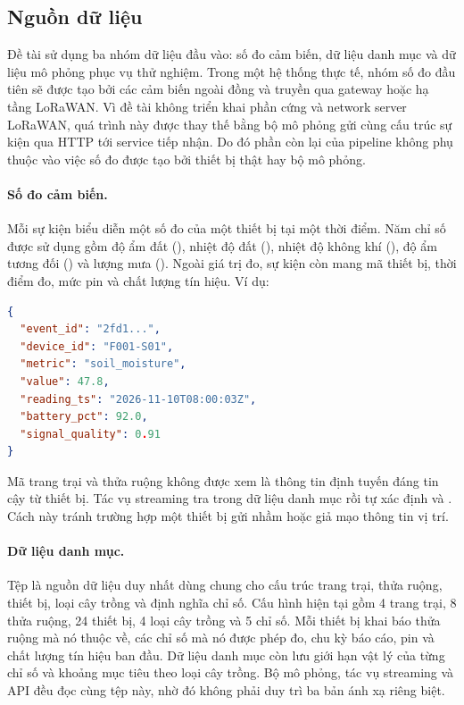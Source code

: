 \subsection{Nguồn dữ liệu}
\label{sec:3-data-sources-detail}

Đề tài sử dụng ba nhóm dữ liệu đầu vào: số đo cảm biến, dữ liệu danh mục và dữ liệu mô phỏng phục vụ thử nghiệm. Trong một hệ thống thực tế, nhóm số đo đầu tiên sẽ được tạo bởi các cảm biến ngoài đồng và truyền qua gateway hoặc hạ tầng LoRaWAN. Vì đề tài không triển khai phần cứng và network server LoRaWAN, quá trình này được thay thế bằng bộ mô phỏng gửi cùng cấu trúc sự kiện qua HTTP tới service tiếp nhận. Do đó phần còn lại của pipeline không phụ thuộc vào việc số đo được tạo bởi thiết bị thật hay bộ mô phỏng.

\paragraph{Số đo cảm biến.}
Mỗi sự kiện biểu diễn một số đo của một thiết bị tại một thời điểm. Năm chỉ số được sử dụng gồm độ ẩm đất (), nhiệt độ đất (), nhiệt độ không khí (), độ ẩm tương đối () và lượng mưa (). Ngoài giá trị đo, sự kiện còn mang mã thiết bị, thời điểm đo, mức pin và chất lượng tín hiệu. Ví dụ:

\begin{lstlisting}[language=json, caption={Ví dụ payload số đo cảm biến}, label={lst:3-sensor-payload}]
{
  "event_id": "2fd1...",
  "device_id": "F001-S01",
  "metric": "soil_moisture",
  "value": 47.8,
  "reading_ts": "2026-11-10T08:00:03Z",
  "battery_pct": 92.0,
  "signal_quality": 0.91
}
\end{lstlisting}

Mã trang trại và thửa ruộng không được xem là thông tin định tuyến đáng tin cậy từ thiết bị. Tác vụ streaming tra  trong dữ liệu danh mục rồi tự xác định  và . Cách này tránh trường hợp một thiết bị gửi nhầm hoặc giả mạo thông tin vị trí.

\paragraph{Dữ liệu danh mục.}
Tệp  là nguồn dữ liệu duy nhất dùng chung cho cấu trúc trang trại, thửa ruộng, thiết bị, loại cây trồng và định nghĩa chỉ số. Cấu hình hiện tại gồm 4 trang trại, 8 thửa ruộng, 24 thiết bị, 4 loại cây trồng và 5 chỉ số. Mỗi thiết bị khai báo thửa ruộng mà nó thuộc về, các chỉ số mà nó được phép đo, chu kỳ báo cáo, pin và chất lượng tín hiệu ban đầu. Dữ liệu danh mục còn lưu giới hạn vật lý của từng chỉ số và khoảng mục tiêu theo loại cây trồng. Bộ mô phỏng, tác vụ streaming và API đều đọc cùng tệp này, nhờ đó không phải duy trì ba bản ánh xạ riêng biệt.

